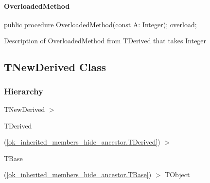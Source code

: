 \documentclass{report}
\newif\ifpdf
\begin{document}
\paragraph*{OverloadedMethod}\hspace*{\fill}

\label{ok_inherited_members_hide_ancestor.TDerived-OverloadedMethod}
\begin{list}{}{
\setlength{\itemindent}{0cm}
\setlength{\listparindent}{0cm}
\setlength{\leftmargin}{\evensidemargin}
\addtolength{\leftmargin}{\tmplength}
\settowidth{\labelsep}{X}
\addtolength{\leftmargin}{\labelsep}
\setlength{\labelwidth}{\tmplength}
}
\item[\textbf{Declaration}\hfill]
\ifpdf
\begin{flushleft}
\fi
\begin{ttfamily}
public procedure OverloadedMethod(const A: Integer); overload;\end{ttfamily}

\ifpdf
\end{flushleft}
\fi

\par
\item[\textbf{Description}]
Description of OverloadedMethod from TDerived that takes Integer

\end{list}
\ifpdf
\subsection*{\large{\textbf{TNewDerived Class}}\normalsize\hspace{1ex}\hrulefill}
\else
\subsection*{TNewDerived Class}
\fi
\label{ok_inherited_members_hide_ancestor.TNewDerived}
\subsubsection*{\large{\textbf{Hierarchy}}\normalsize\hspace{1ex}\hfill}
TNewDerived {$>$} \begin{ttfamily}TDerived\end{ttfamily}(\ref{ok_inherited_members_hide_ancestor.TDerived}) {$>$} \begin{ttfamily}TBase\end{ttfamily}(\ref{ok_inherited_members_hide_ancestor.TBase}) {$>$} 
TObject
\end{document}
